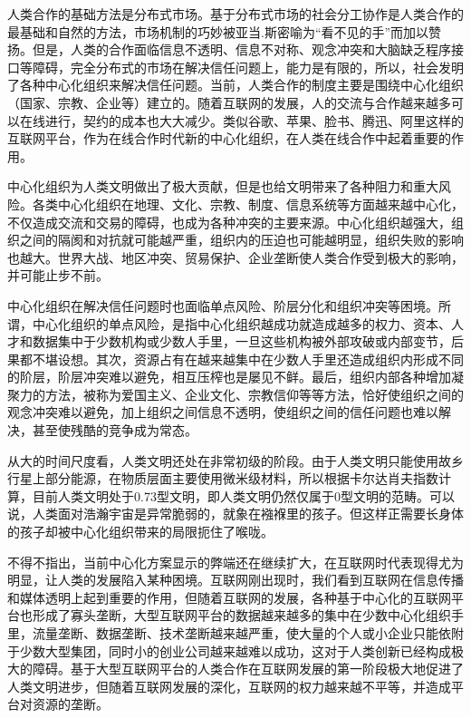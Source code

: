 \documentclass[a4paper,12pt]{article}
\begin{document}
人类合作的基础方法是分布式市场。基于分布式市场的社会分工协作是人类合作的最基础和自然的方法，市场机制的巧妙被亚当.斯密喻为“看不见的手”而加以赞扬。但是，人类的合作面临信息不透明、信息不对称、观念冲突和大脑缺乏程序接口等障碍，完全分布式的市场在解决信任问题上，能力是有限的，所以，社会发明了各种中心化组织来解决信任问题。当前，人类合作的制度主要是围绕中心化组织（国家、宗教、企业等）建立的。随着互联网的发展，人的交流与合作越来越多可以在线进行，契约的成本也大大减少。类似谷歌、苹果、脸书、腾迅、阿里这样的互联网平台，作为在线合作时代新的中心化组织，在人类在线合作中起着重要的作用。

中心化组织为人类文明做出了极大贡献，但是也给文明带来了各种阻力和重大风险。各类中心化组织在地理、文化、宗教、制度、信息系统等方面越来越中心化，不仅造成交流和交易的障碍，也成为各种冲突的主要来源。中心化组织越强大，组织之间的隔阂和对抗就可能越严重，组织内的压迫也可能越明显，组织失败的影响也越大。世界大战、地区冲突、贸易保护、企业垄断使人类合作受到极大的影响，并可能止步不前。

中心化组织在解决信任问题时也面临单点风险、阶层分化和组织冲突等困境。所谓，中心化组织的单点风险，是指中心化组织越成功就造成越多的权力、资本、人才和数据集中于少数机构或少数人手里，一旦这些机构被外部攻破或内部变节，后果都不堪设想。其次，资源占有在越来越集中在少数人手里还造成组织内形成不同的阶层，阶层冲突难以避免，相互压榨也是屡见不鲜。最后，组织内部各种增加凝聚力的方法，被称为爱国主义、企业文化、宗教信仰等等方法，恰好使组织之间的观念冲突难以避免，加上组织之间信息不透明，使组织之间的信任问题也难以解决，甚至使残酷的竞争成为常态。

从大的时间尺度看，人类文明还处在非常初级的阶段。由于人类文明只能使用故乡行星上部分能源，在物质层面主要使用微米级材料，所以根据卡尔达肖夫指数计算，目前人类文明处于0.73型文明\citep{sagan2000}，即人类文明仍然仅属于0型文明的范畴。可以说，人类面对浩瀚宇宙是异常脆弱的，就象在襁褓里的孩子。但这样正需要长身体的孩子却被中心化组织带来的局限扼住了喉咙。

不得不指出，当前中心化方案显示的弊端还在继续扩大，在互联网时代表现得尤为明显，让人类的发展陷入某种困境。互联网刚出现时，我们看到互联网在信息传播和媒体透明上起到重要的作用，但随着互联网的发展，各种基于中心化的互联网平台也形成了寡头垄断，大型互联网平台的数据越来越多的集中在少数中心化组织手里，流量垄断、数据垄断、技术垄断越来越严重，使大量的个人或小企业只能依附于少数大型集团，同时小的创业公司越来越难以成功，这对于人类创新已经构成极大的障碍。基于大型互联网平台的人类合作在互联网发展的第一阶段极大地促进了人类文明进步，但随着互联网发展的深化，互联网的权力越来越不平等，并造成平台对资源的垄断。
\end{document}
